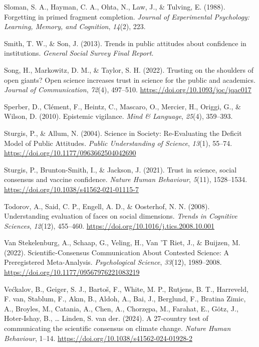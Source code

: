 \documentclass[
  jou,
  floatsintext,
  longtable,
  nolmodern,
  notxfonts,
  notimes,
  colorlinks=true,linkcolor=blue,citecolor=blue,urlcolor=blue]{apa7}
\newlength{\cslhangindent}
\newenvironment{CSLReferences}[2] %
 {\begin{list}{}{%
  \setlength{\itemindent}{0pt}
  \setlength{\leftmargin}{0pt}
  \setlength{\parsep}{0pt}
  \ifodd #1
   \setlength{\leftmargin}{\cslhangindent}
   \setlength{\itemindent}{-1\cslhangindent}
  \fi
  \setlength{\itemsep}{#2\baselineskip}}}
 {\end{list}}
\begin{document}
\begin{CSLReferences}{1}{0}
Sloman, S. A., Hayman, C. A., Ohta, N., Law, J., \& Tulving, E. (1988).
Forgetting in primed fragment completion. \emph{Journal of Experimental
Psychology: Learning, Memory, and Cognition}, \emph{14}(2), 223.

Smith, T. W., \& Son, J. (2013). Trends in public attitudes about
confidence in institutions. \emph{General Social Survey Final Report}.

Song, H., Markowitz, D. M., \& Taylor, S. H. (2022). Trusting on the
shoulders of open giants? Open science increases trust in science for
the public and academics. \emph{Journal of Communication}, \emph{72}(4),
497--510. \url{https://doi.org/10.1093/joc/jqac017}

Sperber, D., Clément, F., Heintz, C., Mascaro, O., Mercier, H., Origgi,
G., \& Wilson, D. (2010). Epistemic vigilance. \emph{Mind \& Language},
\emph{25}(4), 359--393.

Sturgis, P., \& Allum, N. (2004). Science in Society: Re-Evaluating the
Deficit Model of Public Attitudes. \emph{Public Understanding of
Science}, \emph{13}(1), 55--74.
\url{https://doi.org/10.1177/0963662504042690}

Sturgis, P., Brunton-Smith, I., \& Jackson, J. (2021). Trust in science,
social consensus and vaccine confidence. \emph{Nature Human Behaviour},
\emph{5}(11), 1528--1534.
\url{https://doi.org/10.1038/s41562-021-01115-7}

Todorov, A., Said, C. P., Engell, A. D., \& Oosterhof, N. N. (2008).
Understanding evaluation of faces on social dimensions. \emph{Trends in
Cognitive Sciences}, \emph{12}(12), 455--460.
\url{https://doi.org/10.1016/j.tics.2008.10.001}

Van Stekelenburg, A., Schaap, G., Veling, H., Van 'T Riet, J., \&
Buijzen, M. (2022). Scientific-Consensus Communication About Contested
Science: A Preregistered Meta-Analysis. \emph{Psychological Science},
\emph{33}(12), 1989--2008.
\url{https://doi.org/10.1177/09567976221083219}

Većkalov, B., Geiger, S. J., Bartoš, F., White, M. P., Rutjens, B. T.,
Harreveld, F. van, Stablum, F., Akın, B., Aldoh, A., Bai, J., Berglund,
F., Bratina Zimic, A., Broyles, M., Catania, A., Chen, A., Chorzępa, M.,
Farahat, E., Götz, J., Hoter-Ishay, B., \ldots{} Linden, S. van der.
(2024). A 27-country test of communicating the scientific consensus on
climate change. \emph{Nature Human Behaviour}, 1--14.
\url{https://doi.org/10.1038/s41562-024-01928-2}


\end{CSLReferences}
\end{document}
